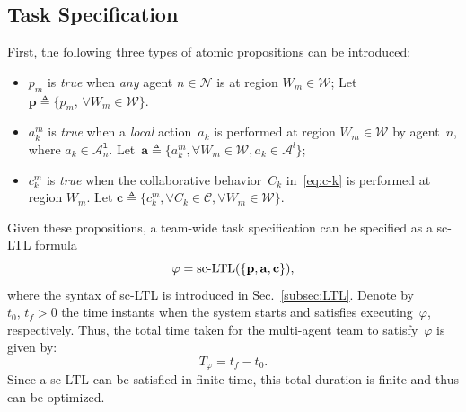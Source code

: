\subsection{Task Specification}\label{subsec:task-specification}
First, the following three types of atomic propositions can be introduced:
\begin{itemize}
\item $p_m$ is \emph{true} when \emph{any} agent $n\in \mathcal{N}$ is at region ${W}_m\in {\mathcal{W}}$;
Let $\mathbf{p}\triangleq \{p_m,\, \forall {W}_m \in {\mathcal{W}}\}$.
\item $a^m_k$ is \emph{true} when a \emph{local} action~$a_k$ is performed at region ${W}_m\in{\mathcal{W}}$ by
 agent~$n$, where $a_k \in \mathcal{A}_n^{\texttt{l}}$.
Let~$\mathbf{a} \triangleq\{a^m_k,\forall {W}_m \in \mathcal{W}, a_k\in \mathcal{A}^{l}\}$;
\item $c^m_k$ is \emph{true} when the collaborative behavior~$C_k$ in~\eqref{eq:c-k} is performed at region $W_m$.
Let $\mathbf{c} \triangleq\{c^m_k,\forall C_k \in \mathcal{C},\forall {W}_m \in {\mathcal{W}}\}$.
\end{itemize}

Given these propositions, a team-wide task specification can be specified as a sc-LTL formula
\begin{equation}\label{eq:task}
\varphi=\textup{sc-LTL}(\{\mathbf{p}, \mathbf{a}, \mathbf{c}\}),
\end{equation}
where the syntax of sc-LTL is introduced in Sec.~\ref{subsec:LTL}.
Denote by~$t_0,\, t_f>0$ the time instants when the system starts
and satisfies executing~$\varphi$, respectively.
Thus, the total time taken for the multi-agent team to satisfy~$\varphi$ is given by:
\begin{equation}\label{eq:task-freq}
T_\varphi = t_f-t_0.
\end{equation}
Since a sc-LTL can be satisfied in finite time, this total duration is finite and thus can be optimized. 


